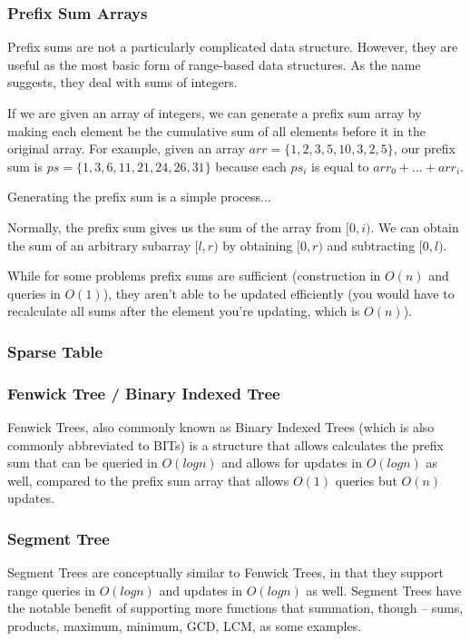 \subsubsection{Prefix Sum Arrays}

Prefix sums are not a particularly complicated data structure. However, they are useful as the most basic form of range-based data structures. As the name suggests, they deal with sums of integers.

If we are given an array of integers, we can generate a prefix sum array by making each element be the cumulative sum of all elements before it in the original array. For example, given an array $arr = \{1,2,3,5,10,3,2,5\}$, our prefix sum is $ps = \{1,3,6,11,21,24,26,31\}$ because each $ps_i$ is equal to $arr_0 + ... + arr_i$.

Generating the prefix sum is a simple process...

Normally, the prefix sum gives us the sum of the array from $[0,i)$. We can obtain the sum of an arbitrary subarray $[l,r)$ by obtaining $[0,r)$ and subtracting $[0,l)$. 

While for some problems prefix sums are sufficient (construction in $O(n)$ and queries in $O(1)$), they aren't able to be updated efficiently (you would have to recalculate all sums after the element you're updating, which is $O(n)$).

\subsubsection{Sparse Table}
\subsubsection{Fenwick Tree / Binary Indexed Tree}

Fenwick Trees, also commonly known as Binary Indexed Trees (which is also commonly abbreviated to BITs) is a structure that allows calculates the prefix sum that can be queried in $O(log n)$ and allows for updates in $O(log n)$ as well, compared to the prefix sum array that allows $O(1)$ queries but $O(n)$ updates.

\subsubsection{Segment Tree}

Segment Trees are conceptually similar to Fenwick Trees, in that they support range queries in $O(log n)$ and updates in $O(log n)$ as well. Segment Trees have the notable benefit of supporting more functions that summation, though -- sums, products, maximum, minimum, GCD, LCM, as some examples.

